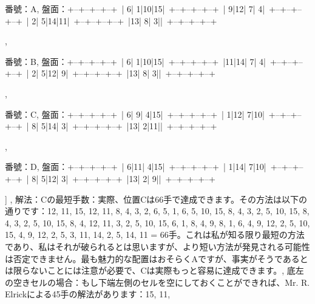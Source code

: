 \documentclass[10pt,a4paper,oneside,openany]{ltjsbook}
\begin{document}
\begin{tcolorbox}[colback=softblue,colframe=primaryblue,title=\textbf{第 343 問：EXERCISE FOR PRISONERS.},arc=2mm,boxrule=1pt,breakable]
                番號：A,
                盤面：+--+--+--+--+\
| 6| 1|10|15|\
+--+--+--+--+\
| 9|12| 7| 4|\
+--+--+--+--+\
| 2| 5|14|11|\
+--+--+--+--+\
|13| 8| 3|\textit{}|\
+--+--+--+--+\

            ,
            
                番號：B,
                盤面：+--+--+--+--+\
| 6| 1|10|15|\
+--+--+--+--+\
|11|14| 7| 4|\
+--+--+--+--+\
| 2| 5|12| 9|\
+--+--+--+--+\
|13| 8| 3|\textit{}|\
+--+--+--+--+\

            ,
            
                番號：C,
                盤面：+--+--+--+--+\
| 6| 9| 4|15|\
+--+--+--+--+\
| 1|12| 7|10|\
+--+--+--+--+\
| 8| 5|14| 3|\
+--+--+--+--+\
|13| 2|11|\textit{}|\
+--+--+--+--+\

            ,
            
                番號：D,
                盤面：+--+--+--+--+\
| 6|11| 4|15|\
+--+--+--+--+\
| 1|14| 7|10|\
+--+--+--+--+\
| 8| 5|12| 3|\
+--+--+--+--+\
|13| 2| 9|\textit{}|\
+--+--+--+--+\

            
        ]
    ,
    解法：Cの最短手数：実際、位置Cは66手で達成できます。その方法は以下の通りです：12, 11, 15, 12, 11, 8, 4, 3, 2, 6, 5, 1, 6, 5, 10, 15, 8, 4, 3, 2, 5, 10, 15, 8, 4, 3, 2, 5, 10, 15, 8, 4, 12, 11, 3, 2, 5, 10, 15, 6, 1, 8, 4, 9, 8, 1, 6, 4, 9, 12, 2, 5, 10, 15, 4, 9, 12, 2, 5, 3, 11, 14, 2, 5, 14, 11 = 66手。これは私が知る限り最短の方法であり、私はそれが破られるとは思いますが、より短い方法が発見される可能性は否定できません。最も魅力的な配置はおそらくAですが、事実がそうであるとは限らないことには注意が必要で、Cは実際もっと容易に達成できます。,
        底左の空きセルの場合：もし下端左側のセルを空にしておくことができれば、Mr. R. Elrickによる45手の解法があります：15, 11,
\end{tcolorbox}
\end{document}
